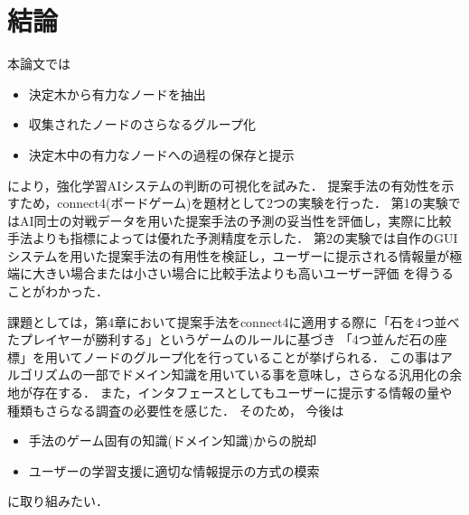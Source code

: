\chapter{結論}

本論文では
\begin{itemize}
	\item 決定木から有力なノードを抽出
	\item 収集されたノードのさらなるグループ化
	\item 決定木中の有力なノードへの過程の保存と提示
\end{itemize}

により，強化学習AIシステムの判断の可視化を試みた．
提案手法の有効性を示すため，connect4(ボードゲーム)を題材として2つの実験を行った．
第1の実験ではAI同士の対戦データを用いた提案手法の予測の妥当性を評価し，実際に比較手法よりも指標によっては優れた予測精度を示した．
第2の実験では自作のGUIシステムを用いた提案手法の有用性を検証し，ユーザーに提示される情報量が極端に大きい場合または小さい場合に比較手法よりも高いユーザー評価
を得うることがわかった．

課題としては，第4章において提案手法をconnect4に適用する際に「石を4つ並べたプレイヤーが勝利する」というゲームのルールに基づき
「4つ並んだ石の座標」を用いてノードのグループ化を行っていることが挙げられる．
この事はアルゴリズムの一部でドメイン知識を用いている事を意味し，さらなる汎用化の余地が存在する．
また，インタフェースとしてもユーザーに提示する情報の量や種類もさらなる調査の必要性を感じた．
そのため，
今後は
\begin{itemize}
	\item 手法のゲーム固有の知識(ドメイン知識)からの脱却
	\item ユーザーの学習支援に適切な情報提示の方式の模索
\end{itemize}


に取り組みたい．
